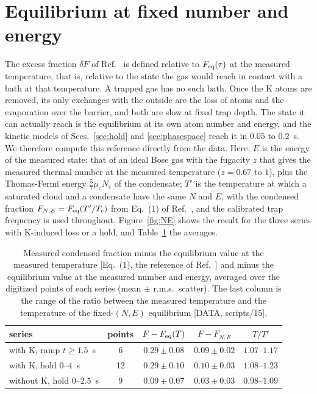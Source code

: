 \section{Equilibrium at fixed number and energy}
\label{sec:NE}
The excess fraction $\delta F$ of Ref.~\cite{MelladoMunoz2020} is defined
relative to $F_{\rm eq}(\tau)$ at the measured temperature, that is,
relative to the state the gas would reach in contact with a bath at that
temperature. A trapped gas has no such bath. Once the K atoms are removed,
its only exchanges with the outside are the loss of atoms and the
evaporation over the barrier, and both are slow at fixed trap depth. The
state it can actually reach is the equilibrium at its own atom number and
energy, and the kinetic models of Secs.~\ref{sec:hold} and
\ref{sec:phasespace} reach it in $0.05$ to $0.2$~s. We therefore compute
this reference directly from the data. Here, $E$ is the energy of the
measured state: that of an ideal Bose gas with the fugacity $z$ that gives
the measured thermal number at the measured temperature ($z=0.67$ to $1$),
plus the Thomas-Fermi energy $\frac57\mu_cN_c$ of the condensate; $T'$ is
the temperature at which a saturated cloud and a condensate have the same
$N$ and $E$, with the condensed fraction $F_{N,E}=F_{\rm eq}(T'/T_c)$ from
Eq.~(1) of Ref.~\cite{MelladoMunoz2020}, and the calibrated trap frequency
is used throughout. Figure~\ref{fig:NE} shows the result for the three
series with K-induced loss or a hold, and Table~\ref{tab:NE} the averages.

\begin{table}[t]
\caption{Measured condensed fraction minus the equilibrium value at the
measured temperature [Eq.~(1), the reference of
Ref.~\cite{MelladoMunoz2020}] and minus the equilibrium value at the
measured number and energy, averaged over the digitized points of each
series (mean $\pm$ r.m.s.\ scatter). The last column is the range of the
ratio between the measured temperature and the temperature of the
fixed-$(N,E)$ equilibrium [DATA, scripts/15].}
\label{tab:NE}
\begin{ruledtabular}
\begin{tabular}{lcccc}
series & points & $F-F_{\rm eq}(T)$ & $F-F_{N,E}$ & $T/T'$ \\
\hline
with K, ramp $t\ge1.5$~s & 6 & $0.29\pm0.08$ & $0.09\pm0.02$ & $1.07$--$1.17$ \\
with K, hold $0$--$4$~s & 12 & $0.29\pm0.10$ & $0.10\pm0.03$ & $1.08$--$1.23$ \\
without K, hold $0$--$2.5$~s & 9 & $0.09\pm0.07$ & $0.03\pm0.03$ & $0.98$--$1.09$ \\
\end{tabular}
\end{ruledtabular}
\end{table}

